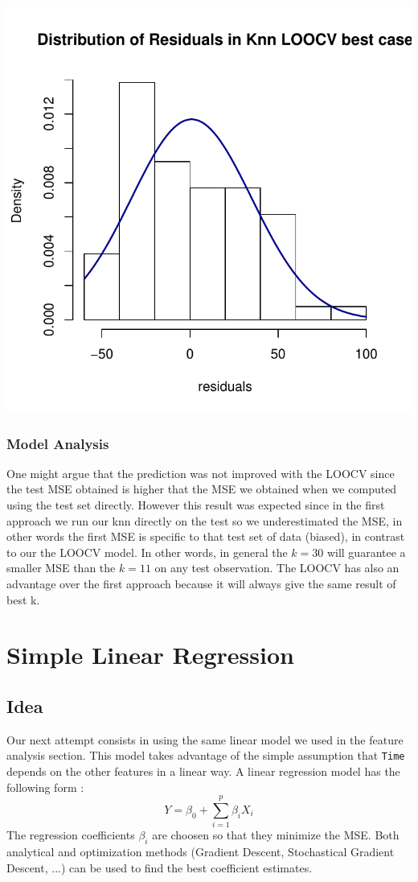 \documentclass[]{report}
\begin{document}
\begin{center}
	\includegraphics[width=0.8\linewidth]{Figures/knn_predicted_LOOCV_residuals.pdf}
	\label{fig:knn_predicted_residuals_LOOCV}
\end{center}



\subsubsection{Model Analysis}
One might argue that the prediction was not improved with the LOOCV since the test MSE obtained is higher that the MSE we obtained when we computed using the test set directly. However this result was expected since in the first approach we run our knn directly on the test so we underestimated the MSE, in other words the first MSE is specific to that test set of data (biased), in contrast to our the LOOCV model. In other words, in general the $k=30$ will guarantee a smaller MSE than the $k=11$ on any test observation.
The LOOCV has also an advantage over the first approach because it will always give the same result of best k.

\section{Simple Linear Regression}
\subsection{Idea}
Our next attempt consists in using the same linear model we used in the feature analysis section. This model takes advantage of the simple assumption that \texttt{Time} depends on the other features in a linear way. A linear regression model has the following form :
$$
	Y = \beta_0 + \sum_{i = 1}^{p} \beta_i X_i
$$
The regression coefficients $\beta_i$ are choosen so that they minimize the MSE. Both analytical and optimization methods (Gradient Descent, Stochastical Gradient Descent, ...) can be used to find the best coefficient estimates.
\end{document}
